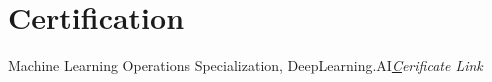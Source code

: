\documentclass[a4paper,20pt]{article}
\newcommand{\resumeItem}[2]{
  \item\small{
    \textbf{#1}{: #2 \vspace{-2pt}}
  }
}
\newcommand{\resumeSubItem}[2]{\resumeItem{#1}{#2}\vspace{-3pt}}
\newcommand{\resumeSubHeadingListStart}{\begin{itemize}[leftmargin=*]}
\newcommand{\resumeSubHeadingListEnd}{\end{itemize}}
\begin{document}

\vspace{3pt}
\section{Certification}

\begin{description}[font=$\bullet$]
\item {Machine Learning Operations Specialization, DeepLearning.AI}\hfill \textit{\href{https://github.com/NalishJain/MLOPs-Certificate} Cerificate Link}

\end{description}
\vspace{3pt}
\end{document}
